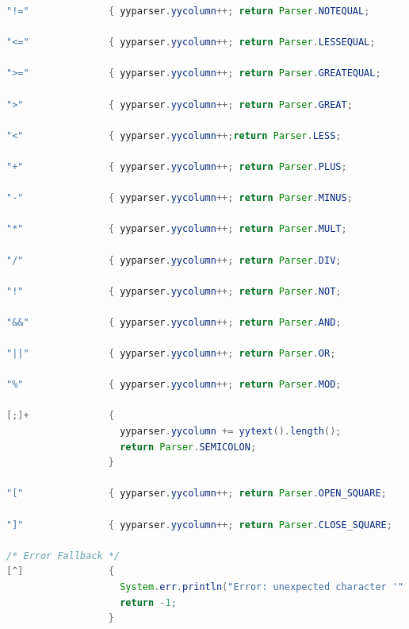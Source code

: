 \documentclass[12pt]{report}
\begin{document}
\begin{singlespace}
\begin{lstlisting}[language=Java,label=some-code,caption={flood$\_$lex.flex}]
"!="              { yyparser.yycolumn++; return Parser.NOTEQUAL;       }

"<="              { yyparser.yycolumn++; return Parser.LESSEQUAL;      }

">="              { yyparser.yycolumn++; return Parser.GREATEQUAL;     }

">"               { yyparser.yycolumn++; return Parser.GREAT;          }

"<"               { yyparser.yycolumn++;return Parser.LESS;            }

"+"               { yyparser.yycolumn++; return Parser.PLUS;           }

"-"               { yyparser.yycolumn++; return Parser.MINUS;          }

"*"               { yyparser.yycolumn++; return Parser.MULT;           }

"/"               { yyparser.yycolumn++; return Parser.DIV;            }

"!"               { yyparser.yycolumn++; return Parser.NOT;            }

"&&"              { yyparser.yycolumn++; return Parser.AND;            }

"||"              { yyparser.yycolumn++; return Parser.OR;             }

"%"               { yyparser.yycolumn++; return Parser.MOD;            }

[;]+              {
                    yyparser.yycolumn += yytext().length();
                    return Parser.SEMICOLON;      
                  }
                    
"["               { yyparser.yycolumn++; return Parser.OPEN_SQUARE;    }

"]"               { yyparser.yycolumn++; return Parser.CLOSE_SQUARE;    }

/* Error Fallback */
[^]               {
                    System.err.println("Error: unexpected character '" + yytext() + "'");
                    return -1; 
                  }
\end{lstlisting}
\end{singlespace}
\end{document}
